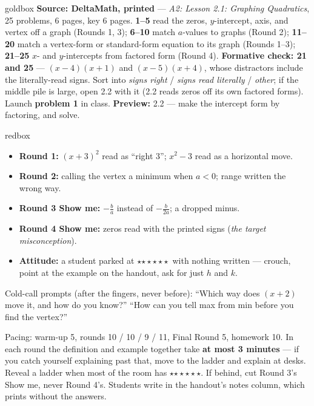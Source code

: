 \documentclass[10pt]{article}
\newcommand{\rung}[1]{{\color{goldacc}\ifcase#1\or$\star$\or$\star\star$\or$\star\star\star$\fi}}
\begin{document}
\boxguard
\begin{skillbox}{goldbox}
\textbf{Source: DeltaMath, printed} --- \emph{A2: Lesson 2.1: Graphing Quadratics}, 25 problems, 6 pages, key 6 pages. \textbf{1--5} read the zeros,
$y$-intercept, axis, and vertex off a graph (Rounds 1, 3); \textbf{6--10} match $a$-values to
graphs (Round 2); \textbf{11--20} match a vertex-form or standard-form equation to its graph
(Rounds 1--3); \textbf{21--25} $x$- and $y$-intercepts from factored form (Round 4).
\textbf{Formative check: 21 and 25} --- $(x-4)(x+1)$ and $(x-5)(x+4)$, whose distractors include
the literally-read signs. Sort into \emph{signs right} / \emph{signs read literally} /
\emph{other}; if the middle pile is large, open 2.2 with it (2.2 reads zeros off its own factored
forms). Launch \textbf{problem 1} in class. \textbf{Preview:} 2.2 --- make the intercept form by
factoring, and solve.
\end{skillbox}

\boxguard
\begin{skillbox}{redbox}
\begin{itemize}[leftmargin=1.2em, nosep]
  \item \textbf{Round 1:} $(x+3)^2$ read as ``right 3''; $x^2-3$ read as a horizontal move.
  \item \textbf{Round 2:} calling the vertex a minimum when $a<0$; range written the wrong way.
  \item \textbf{Round 3 Show me:} $-\frac{b}{a}$ instead of $-\frac{b}{2a}$; a dropped minus.
  \item \textbf{Round 4 Show me:} zeros read with the printed signs (\emph{the target
        misconception}).
  \item \textbf{Attitude:} a student parked at \rung1\ with nothing written --- crouch, point at
        the example on the handout, ask for just $h$ and $k$.
\end{itemize}
Cold-call prompts (after the fingers, never before): ``Which way does $(x+2)$ move it, and how
do you know?'' \; ``How can you tell max from min before you find the vertex?''
\end{skillbox}

\begin{teachernote}[Slides]
Pacing: warm-up 5, rounds 10 / 10 / 9 / 11, Final Round 5, homework 10. In each round the
definition and example together take \textbf{at most 3 minutes} --- if you catch yourself
explaining past that, move to the ladder and explain at desks. Reveal a ladder when most of
the room has \rung2. If behind, cut Round 3's Show me, never Round 4's. Students write in the
handout's notes column, which prints without the answers.
\end{teachernote}
\end{document}
